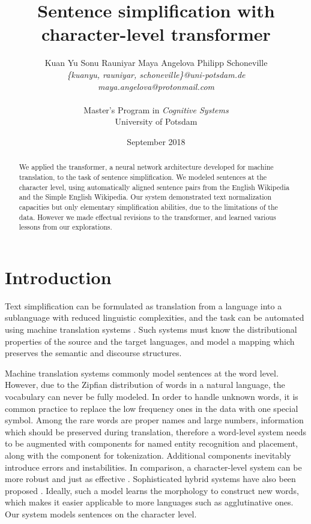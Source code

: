 \documentclass[11pt,twocolumn]{article}
\title{Sentence simplification with character-level transformer}
\author{%
  Kuan Yu \qquad Sonu Rauniyar \qquad Maya Angelova \qquad Philipp Schoneville\\
  \textit{\{kuanyu, rauniyar, schoneville\}@uni-potsdam.de}\\
  \textit{maya.angelova@protonmail.com}\\
  \\
  Master's Program in \emph{Cognitive Systems}\\
  University of Potsdam}
\date{September 2018}
\begin{document}
\maketitle

\begin{abstract}
  We applied the transformer,
  a neural network architecture developed for machine translation,
  to the task of sentence simplification.
  We modeled sentences at the character level,
  using automatically aligned sentence pairs from the English Wikipedia and the Simple English Wikipedia.
  Our system demonstrated text normalization capacities but only elementary simplification abilities,
  due to the limitations of the data.
  However we made effectual revisions to the transformer,
  and learned various lessons from our explorations.
\end{abstract}

\section{Introduction}

Text simplification can be formulated as translation from a language into a sublanguage
with reduced linguistic complexities,
and the task can be automated using machine translation systems
\parencite{wubben2012sentence, narayan2014hybrid, xu2016optimizing}.
Such systems must know the distributional properties of the source and the target languages,
and model a mapping which preserves the semantic and discourse structures.

Machine translation systems commonly model sentences at the word level.
However, due to the Zipfian distribution of words in a natural language,
the vocabulary can never be fully modeled.
In order to handle unknown words,
it is common practice to replace the low frequency ones in the data with one special symbol.
Among the rare words are proper names and large numbers,
information which should be preserved during translation,
therefore a word-level system needs to be augmented with components for named entity recognition and placement,
along with the component for tokenization.
Additional components inevitably introduce errors and instabilities.
In comparison, a character-level system can be more robust and just as effective \parencite{kalchbrenner2016neural}.
Sophisticated hybrid systems have also been proposed \parencite{luong2016achieving, wu2016google}.
Ideally, such a model learns the morphology to construct new words,
which makes it easier applicable to more languages such as agglutinative ones.
Our system models sentences on the character level.
\end{document}
